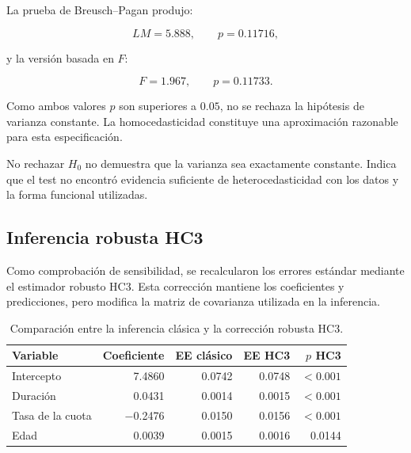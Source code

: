 La prueba de Breusch--Pagan produjo:

\[
LM=\num{5.888},
\qquad
p=\num{0.11716},
\]

y la versión basada en \(F\):

\[
F=\num{1.967},
\qquad
p=\num{0.11733}.
\]

Como ambos valores \(p\) son superiores a \(0.05\), no se rechaza la
hipótesis de varianza constante. La homocedasticidad constituye una
aproximación razonable para esta especificación.

No rechazar \(H_0\) no demuestra que la varianza sea exactamente
constante. Indica que el test no encontró evidencia suficiente de
heterocedasticidad con los datos y la forma funcional utilizadas.

\subsection{Inferencia robusta HC3}

Como comprobación de sensibilidad, se recalcularon los errores estándar
mediante el estimador robusto HC3. Esta corrección mantiene los
coeficientes y predicciones, pero modifica la matriz de covarianza
utilizada en la inferencia.

\begin{table}[H]
    \centering
    \caption{Comparación entre la inferencia clásica y la corrección
    robusta HC3.}
    \label{tab:hc3-ols}

    \begin{tabular}{
        @{}
        l
        r
        r
        r
        r
        @{}
    }
        \toprule
        Variable
        & Coeficiente
        & EE clásico
        & EE HC3
        & \(p\) HC3 \\
        \midrule

        Intercepto
        & \num{7.4860}
        & \num{0.0742}
        & \num{0.0748}
        & \(<0.001\) \\

        Duración
        & \num{0.0431}
        & \num{0.0014}
        & \num{0.0015}
        & \(<0.001\) \\

        Tasa de la cuota
        & \num{-0.2476}
        & \num{0.0150}
        & \num{0.0156}
        & \(<0.001\) \\

        Edad
        & \num{0.0039}
        & \num{0.0015}
        & \num{0.0016}
        & \num{0.0144} \\

        \bottomrule
    \end{tabular}
\end{table}

